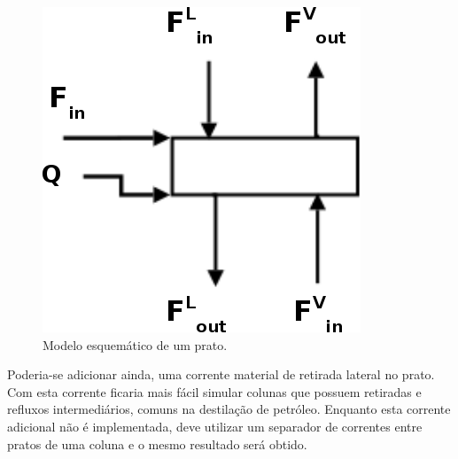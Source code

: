 \begin{figure}[htb]
\centering \includegraphics[scale=0.5]{images/Chap3/esquemaprato2.png}
\caption{Modelo esquemático de um prato.}
\label{fig:prato}
\end{figure}

Poderia-se adicionar ainda, uma corrente material de retirada lateral no prato. Com esta corrente ficaria mais fácil
simular colunas que possuem retiradas e refluxos intermediários, comuns na destilação de petróleo. Enquanto esta
corrente adicional não é implementada, deve utilizar um separador de correntes entre pratos de uma coluna e o mesmo
resultado será obtido.

